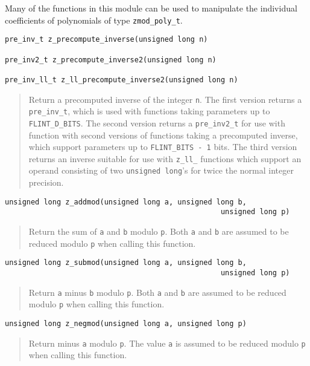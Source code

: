 \documentclass[a4paper,10pt]{article}
\newcommand{\code}{\lstinline}
\begin{document}
Many of the functions in this module can be used to manipulate the individual coefficients of polynomials of type \code{zmod_poly_t}.

\begin{lstlisting}
pre_inv_t z_precompute_inverse(unsigned long n)

pre_inv2_t z_precompute_inverse2(unsigned long n)

pre_inv_ll_t z_ll_precompute_inverse2(unsigned long n)
\end{lstlisting}
\begin{quote}
Return a precomputed inverse of the integer \code{n}. The first version returns a \code{pre_inv_t}, which is used with functions taking parameters up to \code{FLINT_D_BITS}. The second version returns a \code{pre_inv2_t} for use with function with second versions of functions taking a precomputed inverse, which support parameters up to \code{FLINT_BITS - 1} bits. The third version returns an inverse suitable for use with \code{z_ll_} functions which support an operand consisting of two \code{unsigned long}'s for twice the normal integer precision.
\end{quote}

\begin{lstlisting}
unsigned long z_addmod(unsigned long a, unsigned long b, 
                                                  unsigned long p)
\end{lstlisting}
\begin{quote}
Return the sum of \code{a} and \code{b} modulo \code{p}. Both \code{a} and \code{b} are assumed to be reduced modulo \code{p} when calling this function. 
\end{quote}

\begin{lstlisting}
unsigned long z_submod(unsigned long a, unsigned long b, 
                                                  unsigned long p)
\end{lstlisting}
\begin{quote}
Return \code{a} minus \code{b} modulo \code{p}. Both \code{a} and \code{b} are assumed to be reduced modulo \code{p} when calling this function. 
\end{quote}

\begin{lstlisting}
unsigned long z_negmod(unsigned long a, unsigned long p)
\end{lstlisting}
\begin{quote}
Return minus \code{a} modulo \code{p}. The value \code{a} is assumed to be reduced modulo \code{p} when calling this function. 
\end{quote}
\end{document}
